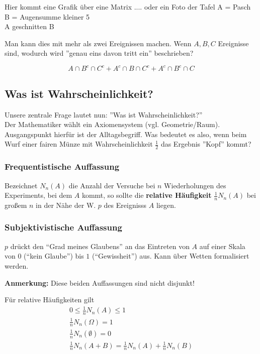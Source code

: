 Hier kommt eine Grafik über eine Matrix .... oder ein Foto der Tafel
A = Pasch\\
B = Augensumme kleiner 5\\
A geschnitten B

Man kann dies mit mehr als zwei Ereignissen machen.
Wenn $A,B,C$ Ereignisse sind, wodurch wird ''genau eins davon tritt ein'' beschrieben?

\begin{equation}
A \cap B^c \cap C^c + A^c \cap  B \cap C^c + A^c \cap B^c \cap C
\end{equation}

\subsection{Was ist Wahrscheinlichkeit?}

Unsere zentrale Frage lautet nun: ''Was ist Wahrscheinlichkeit?''\\
Der Mathematiker wählt ein Axiomensystem (vgl. Geometrie/Raum).
Ausgangspunkt hierfür ist der Alltagsbegriff.
Was bedeutet es also, wenn beim Wurf einer fairen Münze mit Wahrscheinlichkeit $\frac{1}{2}$ das Ergebnis ''Kopf'' kommt?\\

\subsubsection{Frequentistische Auffassung}

Bezeichnet $N_n(A)$ die Anzahl der Versuche bei $n$ Wiederholungen des Experiments, bei dem $A$ kommt, so sollte die \textbf{relative Häufigkeit} $\frac{1}{n} N_n(A)$ bei großem $n$ in der Nähe der W. $p$ des Ereignisss $A$ liegen.

\subsubsection{Subjektivistische Auffassung}

$p$ drückt den ``Grad meines Glaubens'' an das Eintreten von $A$ auf einer Skala von $0$ (``kein Glaube'') bis $1$ (``Gewissheit'') aus.
Kann über Wetten formalisiert werden.

\noindent \textbf{Anmerkung:} Diese beiden Auffassungen sind nicht disjunkt!

Für relative Häufigkeiten gilt
\begin{eqnarray*}
0 \leq \frac{1}{n} N_n(A) \leq 1 \\
\frac{1}{n} N_n(\Omega) = 1 \\
\frac{1}{n} N_n(\emptyset) = 0\\
\frac{1}{n} N_n(A+B) = \frac{1}{n} N_n(A) + \frac{1}{n} N_n(B)
\end{eqnarray*}

